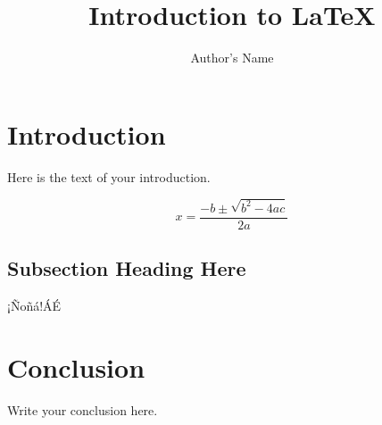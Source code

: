 \documentclass{IOBook}
\begin{document}
\title{Introduction to \LaTeX{}}
\author{Author's Name}

\maketitle

\section{Introduction}
Here is the text of your introduction.

\begin{equation}
  \label{simple_equation}
  x=\frac{-b\pm\sqrt{b^2-4ac}}{2a}
\end{equation}

\subsection{Subsection Heading Here}
¡Ñoñá!ÁÉ
\section{Conclusion}
Write your conclusion here.
\end{document}
